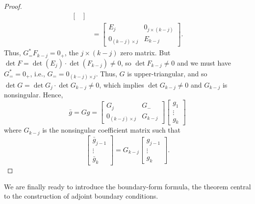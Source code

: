 \documentclass[11pt, oneside, a4paper]{article}
\begin{document}
\begin{proof}
\begin{align*}
\begin{bmatrix}
    \end{bmatrix}\\
    &= \begin{bmatrix}
        E_j & 0_{j\times (k-j)}\\
        0_{(k-j)\times j} & E_{k-j}
    \end{bmatrix}.
\end{align*}
Thus, $G^*_=F_{k-j}=0_+$, the $j\times (k-j)$ zero matrix. But $\det F = \det(E_j)\cdot \det(F_{k-j})\neq 0$, so $\det F_{k-j}\neq 0$ and we must have $G^*_==0_+$, i.e., $G_= =0_{(k-j)\times j}$. Thus, $G$ is upper-triangular, and so $\det G = \det G_j \cdot \det G_{k-j}\neq 0$, which implies $\det G_{k-j}\neq 0$ and $G_{k-j}$ is nonsingular. Hence,
\[\bar{g} = Gg = \begin{bmatrix}G_j & G_-\\
0_{(k-j)\times j} & G_{k-j}\end{bmatrix} \begin{bmatrix}
g_1\\
\vdots\\
g_k
\end{bmatrix}\]
where $G_{k-j}$ is the nonsingular coefficient matrix such that
\[\begin{bmatrix}
    \bar{g}_{j-1}\\
    \vdots\\
    \bar{g}_{k}
\end{bmatrix} = G_{k-j}\begin{bmatrix}
    g_{j-1}\\
    \vdots\\
    g_{k}
\end{bmatrix}.\]
\end{proof}

We are finally ready to introduce the boundary-form formula, the theorem central to the construction of adjoint boundary conditions.
\end{document}
